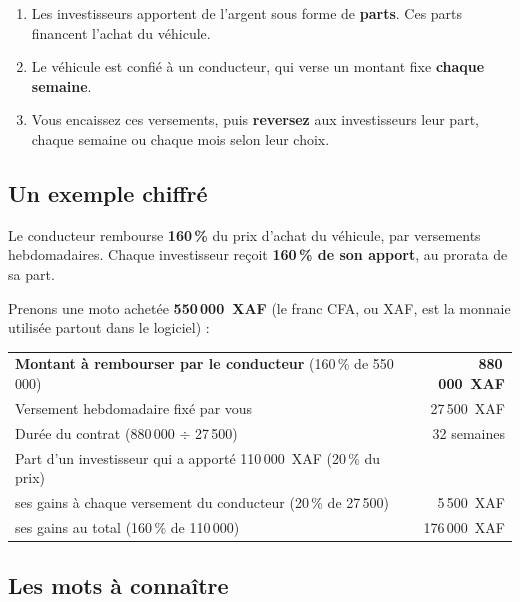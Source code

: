 \documentclass[11pt,a4paper]{article}
\newcommand{\Needspace}[1]{\par\ifdim\pagegoal<\maxdimen\ifdim\dimexpr\pagegoal-\pagetotal\relax<#1\relax\newpage\fi\fi}
\let\oldsubsection\subsection
\renewcommand{\subsection}{\Needspace{10.5cm}\oldsubsection}
\begin{document}
\begin{enumerate}
  \item Les investisseurs apportent de l'argent sous forme de \textbf{parts}. Ces parts financent l'achat du véhicule.
  \item Le véhicule est confié à un conducteur, qui verse un montant fixe \textbf{chaque semaine}.
  \item Vous encaissez ces versements, puis \textbf{reversez} aux investisseurs leur part, chaque semaine ou chaque mois selon leur choix.
\end{enumerate}

\subsection{Un exemple chiffré}

\begin{retenir}
Le conducteur rembourse \textbf{160\,\%} du prix d'achat du véhicule, par versements hebdomadaires. Chaque investisseur reçoit \textbf{160\,\% de son apport}, au prorata de sa part.
\end{retenir}

Prenons une moto achetée \textbf{550\,000~XAF} (le franc CFA, ou XAF, est la monnaie utilisée partout dans le logiciel) :

\begin{center}
\begin{tabularx}{0.92\linewidth}{@{}Xr@{}}
\toprule
\textbf{Montant à rembourser par le conducteur} (160\,\% de 550\,000) & \textbf{880\,000~XAF}\\
Versement hebdomadaire fixé par vous & 27\,500~XAF\\
Durée du contrat (880\,000 $\div$ 27\,500) & 32 semaines\\
\midrule
Part d'un investisseur qui a apporté 110\,000~XAF (20\,\% du prix) & \\
\quad ses gains à chaque versement du conducteur (20\,\% de 27\,500) & 5\,500~XAF\\
\quad ses gains au total (160\,\% de 110\,000) & 176\,000~XAF\\
\bottomrule
\end{tabularx}
\end{center}

\subsection{Les mots à connaître}
\end{document}
